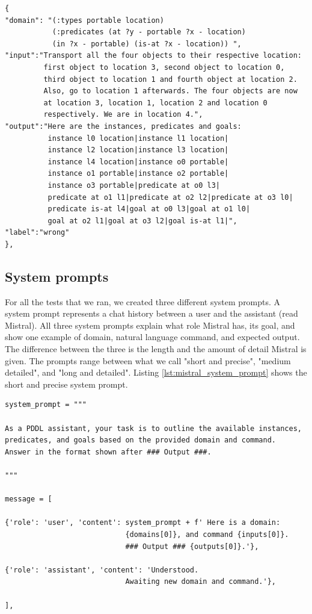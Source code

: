 \begin{lstlisting}[caption={An element of shot set 2. Notice the "label" marker. The output is wrong due to the text before first instance.}, label=lst:elem_shot_set_2]
{
"domain": "(:types portable location)
           (:predicates (at ?y - portable ?x - location)
           (in ?x - portable) (is-at ?x - location)) ",
"input":"Transport all the four objects to their respective location:
         first object to location 3, second object to location 0,
         third object to location 1 and fourth object at location 2.
         Also, go to location 1 afterwards. The four objects are now
         at location 3, location 1, location 2 and location 0
         respectively. We are in location 4.",
"output":"Here are the instances, predicates and goals:
          instance l0 location|instance l1 location|
          instance l2 location|instance l3 location|
          instance l4 location|instance o0 portable|
          instance o1 portable|instance o2 portable|
          instance o3 portable|predicate at o0 l3|
          predicate at o1 l1|predicate at o2 l2|predicate at o3 l0|
          predicate is-at l4|goal at o0 l3|goal at o1 l0|
          goal at o2 l1|goal at o3 l2|goal is-at l1|",
"label":"wrong"
},
\end{lstlisting}

\subsection{System prompts}
For all the tests that we ran, we created three different system prompts. A system prompt represents a chat history between a user and the assistant (read Mistral). All three system prompts explain what role Mistral has, its goal, and show one example of domain, natural language command, and expected output. The difference between the three is the length and the amount of detail Mistral is given. The prompts range between what we call "short and precise", "medium detailed", and "long and detailed". Listing \ref{lst:mistral_system_prompt} shows the short and precise system prompt.

\begin{lstlisting}[caption={The short and precise system prompt. domains[0], inputs[0] and outputs[0] is the first element from the shot set.}, label=lst:mistral_system_prompt]
system_prompt = """

As a PDDL assistant, your task is to outline the available instances,
predicates, and goals based on the provided domain and command.
Answer in the format shown after ### Output ###.

"""

message = [

{'role': 'user', 'content': system_prompt + f' Here is a domain:
                            {domains[0]}, and command {inputs[0]}.
                            ### Output ### {outputs[0]}.'},
                            
{'role': 'assistant', 'content': 'Understood.
                            Awaiting new domain and command.'},
                            
],
\end{lstlisting}

